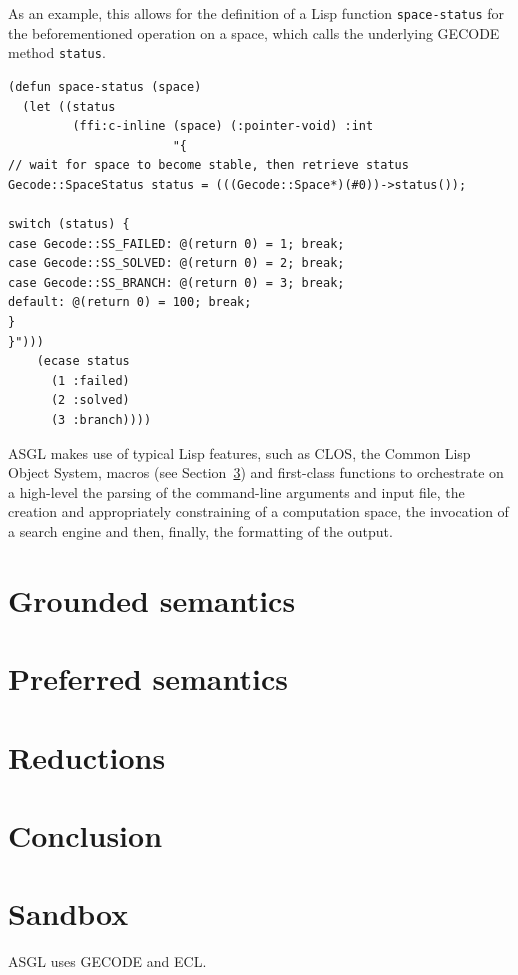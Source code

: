 \documentclass[runningheads,a4paper]{llncs}
\begin{document}
As an example, this allows for the definition of a Lisp function
\texttt{space-status} for the beforementioned operation on a space,
which calls the underlying GECODE method \texttt{status}.

\begin{scriptsize}
\begin{verbatim}
(defun space-status (space)
  (let ((status
         (ffi:c-inline (space) (:pointer-void) :int
                       "{
// wait for space to become stable, then retrieve status
Gecode::SpaceStatus status = (((Gecode::Space*)(#0))->status());

switch (status) {
case Gecode::SS_FAILED: @(return 0) = 1; break;
case Gecode::SS_SOLVED: @(return 0) = 2; break;
case Gecode::SS_BRANCH: @(return 0) = 3; break;
default: @(return 0) = 100; break;
}
}")))
    (ecase status
      (1 :failed)
      (2 :solved)
      (3 :branch))))
\end{verbatim}
\end{scriptsize}

ASGL makes use of typical Lisp features, such as CLOS, the Common Lisp
Object System, macros (see Section~\ref{sec:reductions}) and
first-class functions to orchestrate on a high-level the parsing of
the command-line arguments and input file, the creation and
appropriately constraining of a computation space, the invocation of a
search engine and then, finally, the formatting of the output.

\section{Grounded semantics}\label{sec:grounded}

\section{Preferred semantics}\label{sec:preferred}

\section{Reductions}\label{sec:reductions}

\section{Conclusion}\label{sec:conclusion}


\section{Sandbox}\label{sec:sandbox}
ASGL\cite{asgl} uses GECODE\cite{gecode} and ECL\cite{ecl}.
\end{document}
